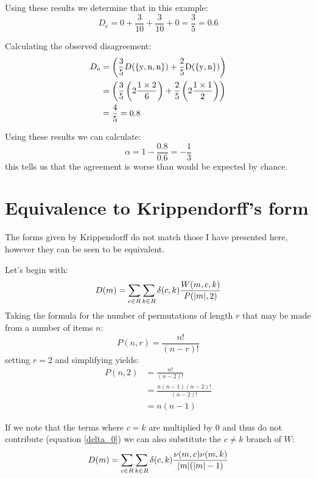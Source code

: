 \documentclass{article}
\begin{document}
Using these results we determine that in this example:
\begin{equation}
D_e = 0 + \frac{3}{10} + \frac{3}{10} + 0 = \frac{3}{5} = 0.6
\end{equation}

Calculating the observed disagreement:
\begin{align}
D_o &= \left( \frac{3}{5}D(\{ \rm{y}, \rm{n}, \rm{n} \}) + \frac{2}{5}D(\{ \rm{y}, \rm{n} \}) \right) \\
&= \left( \frac{3}{5} \left( 2\frac{1 \times 2}{6} \right) + \frac{2}{5}\left( 2\frac{1 \times 1}{2} \right) \right) \\
&= \frac{4}{5} = 0.8
\end{align}

Using these results we can calculate:
\begin{equation}
\alpha = 1 - \frac{0.8}{0.6} = - \frac{1}{3}
\end{equation}
this tells us that the agreement is worse than would be expected by chance.

\section*{Equivalence to Krippendorff's form}
The forms given by Krippendorff\cite{krippendorff2007computing} do not match
those I have presented here, however they can be seen to be equivalent.

Let's begin with:
\begin{equation}
D(m) = \sum_{c \in R} \sum_{k \in R} \delta(c, k) \frac{W(m, c, k)}{P(|m|, 2)}
\end{equation}
Taking the formula for the number of permutations of length $r$ that may be
made from a number of items $n$:
\begin{equation}
P(n, r) = \frac{n!}{(n - r)!}
\end{equation}
setting $r = 2$ and simplifying yields:
\begin{align}
P(n, 2) &= \frac{n!}{(n - 2)!} \\
&= \frac{n(n-1)(n-2)!}{(n-2)!} \\
&= n(n-1)
\end{align}

If we note that the terms where $c = k$ are multiplied by 0 and thus do not
contribute (equation \ref{delta_0}) we can also substitute the $c \ne k$ branch
of $W$:
\begin{equation}
D(m) = \sum_{c \in R} \sum_{k \in R} \delta(c, k) \frac{\nu(m, c) \nu(m, k)}{|m|(|m| - 1)}
\end{equation}
\end{document}
